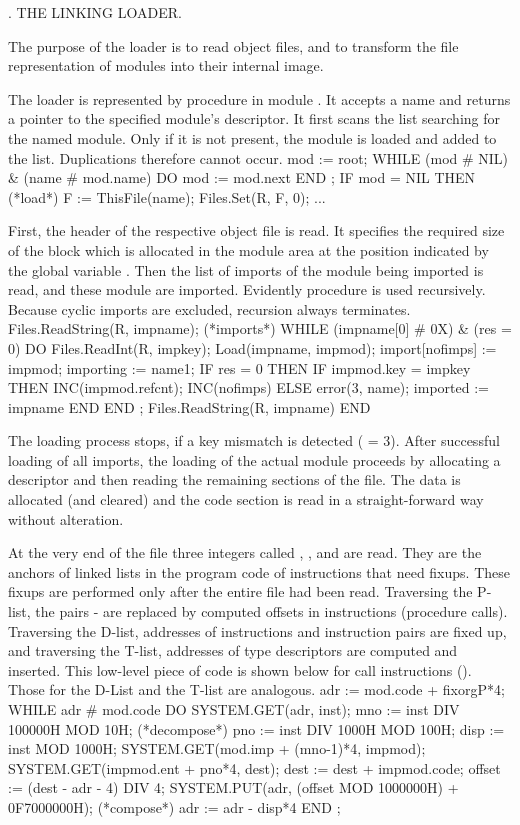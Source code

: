 . THE LINKING LOADER.

The purpose of the loader is to read object files, and to transform the file representation of modules into their internal image.

The loader is represented by procedure  in module . It accepts a name and returns a pointer to the specified module's descriptor. It first scans the list searching for the named module. Only if it is not present, the module is loaded and added to the list. Duplications therefore cannot occur.
\begintt
mod := root;
WHILE (mod # NIL) & (name # mod.name) DO mod := mod.next END ;
IF mod = NIL THEN (*load*) F := ThisFile(name); Files.Set(R, F, 0); ...
\endtt

\noindent First, the header of the respective object file is read. It specifies the required size of the block which is allocated in the module area at the position indicated by the global variable . Then the list of imports of the module being imported is read, and these module are imported. Evidently procedure  is used recursively. Because cyclic imports are excluded, recursion always terminates.
\begintt
Files.ReadString(R, impname); (*imports*)
WHILE (impname[0] # 0X) & (res = 0) DO
  Files.ReadInt(R, impkey);
  Load(impname, impmod); import[nofimps] := impmod; importing := name1;
  IF res = 0 THEN
    IF impmod.key = impkey THEN INC(impmod.refcnt); INC(nofimps)
    ELSE error(3, name); imported := impname
    END
  END ;
  Files.ReadString(R, impname)
END
\endtt

\noindent 
The loading process stops, if a key mismatch is detected ( = 3). After successful loading of all imports, the loading of the actual module proceeds by allocating a descriptor and then reading the remaining sections of the file. The data is allocated (and cleared) and the code section is read in a straight-forward way without alteration.

At the very end of the file three integers called , , and  are read. They are the anchors of linked lists in the program code of instructions that need fixups. These fixups are performed only after the entire file had been read. Traversing the P-list, the pairs - are replaced by computed offsets in  instructions (procedure calls). Traversing the D-list, addresses of  instructions and instruction pairs are fixed up, and traversing the T-list, addresses of type descriptors are computed and inserted. This low-level piece of code is shown below for call instructions (). Those for the D-List and the T-list are analogous.
\begintt
adr := mod.code + fixorgP*4;
WHILE adr # mod.code DO
  SYSTEM.GET(adr, inst);
  mno := inst DIV 100000H MOD 10H; (*decompose*)
  pno := inst DIV 1000H MOD 100H;
  disp := inst MOD 1000H;
  SYSTEM.GET(mod.imp + (mno-1)*4, impmod);
  SYSTEM.GET(impmod.ent + pno*4, dest); dest := dest + impmod.code;
  offset := (dest - adr - 4) DIV 4;
  SYSTEM.PUT(adr, (offset MOD 1000000H) + 0F7000000H); (*compose*)
  adr := adr - disp*4
END ;
\endtt

